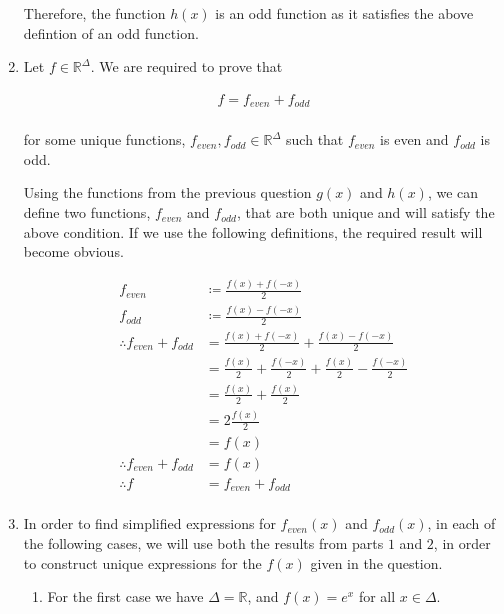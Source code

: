 \documentclass[a4paper]{article}
\begin{document}
\begin{enumerate}[label=\textbf{\arabic*.}]
	Therefore, the function $h(x)$ is an odd function as it satisfies the above defintion of an odd function.

	\pagebreak

	\item Let $\displaystyle{f \in \mathbb{R}^{\Delta}}$. We are required to prove that

	\begin{align*}
	f = f_{even} + f_{odd}\\
	\end{align*}

	for some unique functions, $\displaystyle{f_{even}},{f_{odd} \in \mathbb{R}^{\Delta}}$ such that $\displaystyle{f_{even}}$ is even and $\displaystyle{f_{odd}}$ is odd.

	\bigbreak

	Using the functions from the previous question $g(x)$ and $h(x)$, we can define two functions, $\displaystyle{f_{even}}$ and $\displaystyle{f_{odd}}$, that are both unique and will satisfy the above condition. If we use the following definitions, the required result will become obvious.

	\begin{align*}
	f_{even} & \coloneqq \frac{f(x) + f(-x)}{2}\\
	f_{odd} & \coloneqq \frac{f(x) - f(-x)}{2}\\
	\therefore f_{even} + f_{odd} & = \frac{f(x) + f(-x)}{2} + \frac{f(x) - f(-x)}{2}\\
	& = \frac{f(x)}{2} + \frac{f(-x)}{2} + \frac{f(x)}{2} - \frac{f(-x)}{2}\\
	& = \frac{f(x)}{2} + \frac{f(x)}{2}\\
	& = 2\frac{f(x)}{2}\\
	& = f(x)\\
	\therefore f_{even} + f_{odd} & = f(x)\\
	\therefore f & = f_{even} + f_{odd}\\
	\end{align*}

	\item In order to find simplified expressions for $\displaystyle{f_{even}(x)}$ and $\displaystyle{f_{odd}(x)}$, in each of the following cases, we will use both the results from parts $1$ and $2$, in order to construct unique expressions for the $\displaystyle{f(x)}$ given in the question.

	\begin{enumerate}
		
		\item For the first case we have $\displaystyle{\Delta = \mathbb{R}}$, and $\displaystyle{f(x)=e^x}$ for all $\displaystyle{x \in \Delta}$.


\end{enumerate}
\end{enumerate}
\end{document}
